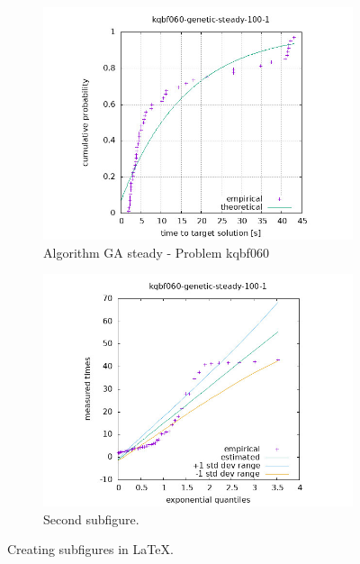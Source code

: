 \begin{figure}[H]
    \centering
    \begin{subfigure}{0.49\textwidth}
        \includegraphics[width=\textwidth]{figure/ttt_plot/kqbf060-genetic-steady-100-1-exp.jpeg}
        \caption{Algorithm GA steady - Problem kqbf060}
        \label{fig:ga-steady-kqbf060-exp}
    \end{subfigure}
    \hfill
    \begin{subfigure}{0.49\textwidth}
        \includegraphics[width=\textwidth]{figure/ttt_plot/kqbf060-genetic-steady-100-1-qq.jpeg}
        \caption{Second subfigure.}
        \label{fig:ga-steady-kqbf060-qq}
    \end{subfigure}
    \caption{Creating subfigures in \LaTeX.}
    \label{fig:ga-steady-kqbf060}
\end{figure}


